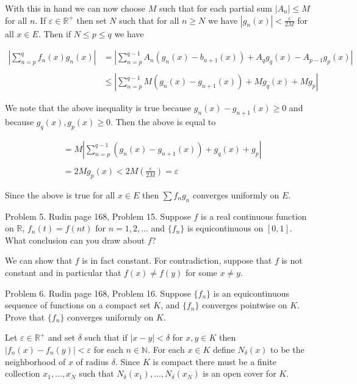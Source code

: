 \documentclass{article}
\begin{document}
  With this in hand we can now choose $M$ such that for each partial sum $|A_n|\leq M$ for all $n$.  If $\varepsilon\in\mathbb R^+$ then set $N$ such that for all $n\geq N$ we have $|g_n(x)|<\frac{\varepsilon}{2M}$ for all $x\in E$.  Then if $N\le p\le q$ we have

  \begin{align*}
    \left|\sum_{n=p}^q f_n(x)g_n(x) \right| &= \left| \sum_{n=p}^{q-1} A_n(g_n(x)-b_{n+1}(x)) + A_qg_q(x)-A_{p-1}g_p(x) \right| \\\\
    &\le \left|\sum_{n=p}^{q-1}M(g_n(x)-g_{n+1}(x))+Mg_q(x)+Mg_p\right| 
  \end{align*}

  We note that the above inequality is true because $g_n(x)-g_{n+1}(x)\geq 0$ and because $g_q(x),g_p(x)\ge 0$.  Then the above is equal to 

  \begin{align*}
    &= M \left|\sum_{n=p}^{q-1}(g_n(x)-g_{n+1}(x))+g_q(x)+g_p\right| \\\\
    &= 2Mg_p(x) <2M\left(\frac{\varepsilon}{2M}\right)=\varepsilon
  \end{align*}

  Since the above is true for all $x\in E$ then $\sum f_ng_n$ converges uniformly on $E$.

\pagebreak
  
  {\Large \color{Sepia} Problem 5. Rudin page 168, Problem 15. Suppose $f$ is a real continuous function on $\mathbb R$, $f_n(t)= f(nt)$ for $n=1,2,\dots$ and $\{f_n\}$ is equicontinuous on $[0,1]$.  What conclusion can you draw about $f$?}

  \vspace{1cm} 

  We can show that $f$ is in fact constant.  For contradiction, suppose that $f$ is not constant and in particular that $f(x)\ne f(y)$ for some $x\ne y$.  

\pagebreak
  
  {\Large \color{Sepia} Problem 6. Rudin page 168, Problem 16. Suppose $\{f_n\}$ is an equicontinuous sequence of functions on a compact set $K$, and $\{f_n\}$ converges pointwise on $K$.  Prove that $\{f_n\}$ converges uniformly on $K$.}

  \vspace{1cm} 

  Let $\varepsilon\in\mathbb R^+$ and set $\delta$ such that if $|x-y|<\delta$ for $x,y\in K$ then $|f_n(x)-f_n(y)|<\varepsilon$ for each $n\in\mathbb N$.  For each $x\in K$ define $N_\delta(x)$ to be the neighborhood of $x$ of radius $\delta$.  Since $K$ is compact there must be a finite collection $x_1,\dots,x_N$ such that $N_\delta(x_1),\dots,N_\delta(x_N)$  is an open cover for $K$.  
\end{document}
